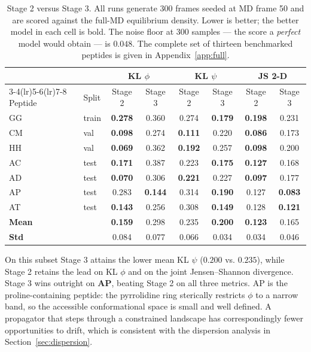 \documentclass[11pt,a4paper]{article}
\begin{document}
\begin{table}[H]
\centering
\caption{Stage 2 versus Stage 3. All runs generate 300 frames seeded at MD
frame 50 and are scored against the full-MD equilibrium density. Lower is
better; the better model in each cell is bold. The noise floor at 300 samples
--- the score a \emph{perfect} model would obtain --- is $0.048$. The complete
set of thirteen benchmarked peptides is given in Appendix~\ref{app:full}.}
\label{tab:bench}
\small
\begin{tabular}{@{}ll cc cc cc@{}}
\toprule
& & \multicolumn{2}{c}{KL $\phi$} & \multicolumn{2}{c}{KL $\psi$}
  & \multicolumn{2}{c}{JS 2-D} \\
\cmidrule(lr){3-4}\cmidrule(lr){5-6}\cmidrule(lr){7-8}
Peptide & Split & Stage 2 & Stage 3 & Stage 2 & Stage 3 & Stage 2 & Stage 3 \\
\midrule
GG & train & \textbf{0.278} & 0.360 & 0.274 & \textbf{0.179} & \textbf{0.198} & 0.231 \\
CM & val   & \textbf{0.098} & 0.274 & \textbf{0.111} & 0.220 & \textbf{0.086} & 0.173 \\
HH & val   & \textbf{0.069} & 0.362 & \textbf{0.192} & 0.257 & \textbf{0.098} & 0.200 \\
AC & test  & \textbf{0.171} & 0.387 & 0.223 & \textbf{0.175} & \textbf{0.127} & 0.168 \\
AD & test  & \textbf{0.070} & 0.306 & \textbf{0.221} & 0.227 & \textbf{0.097} & 0.177 \\
AP & test  & 0.283 & \textbf{0.144} & 0.314 & \textbf{0.190} & 0.127 & \textbf{0.083} \\
AT & test  & \textbf{0.143} & 0.256 & 0.308 & \textbf{0.149} & 0.128 & \textbf{0.121} \\
\midrule
\textbf{Mean} & & \textbf{0.159} & 0.298 & 0.235 & \textbf{0.200} & \textbf{0.123} & 0.165 \\
\textbf{Std}  & & 0.084 & 0.077 & 0.066 & 0.034 & 0.034 & 0.046 \\
\bottomrule
\end{tabular}
\end{table}

\noindent On this subset Stage 3 attains the lower mean KL $\psi$ ($0.200$ vs.
$0.235$), while Stage 2 retains the lead on KL $\phi$ and on the joint
Jensen--Shannon divergence. Stage 3 wins outright on \textbf{AP}, beating
Stage 2 on all three metrics. AP is the proline-containing peptide: the
pyrrolidine ring sterically restricts $\phi$ to a narrow band, so the
accessible conformational space is small and well defined. A propagator that
steps through a constrained landscape has correspondingly fewer opportunities
to drift, which is consistent with the dispersion analysis in
Section~\ref{sec:dispersion}.
\end{document}
